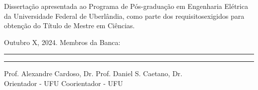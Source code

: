 
\newpage
\thispagestyle{empty}   %
\begin{center}
\ABNTEXchapterfont\large\imprimirautor
\vskip 4cm
\ABNTEXchapterfont\bfseries\Large\imprimirtitulo
\end{center}
\vskip 2cm


\hfill                                                         %
\begin{minipage}{11cm}
Dissertação apresentada ao Programa de Pós-graduação em Engenharia Elétrica da Universidade Federal de Uberlândia, como parte dos requisitosexigidos para obtenção do Título de Mestre em Ciências.

\end{minipage}
\vskip 0.5cm
\noindent  Outubro X, 2024.
\vskip 0.5cm
\noindent Membros da Banca:
\vskip 1cm
\begin{flushleft}
\rule{7cm}{0.4mm}
\hskip 36pt
\rule{7.3cm}{0.4mm}
\end{flushleft}
\vspace{-0.5cm}
Prof. Alexandre Cardoso, Dr. \hskip 2.94cm Prof. Daniel S. Caetano, Dr.\\
Orientador - UFU \hskip 5cm Coorientador - UFU \\
